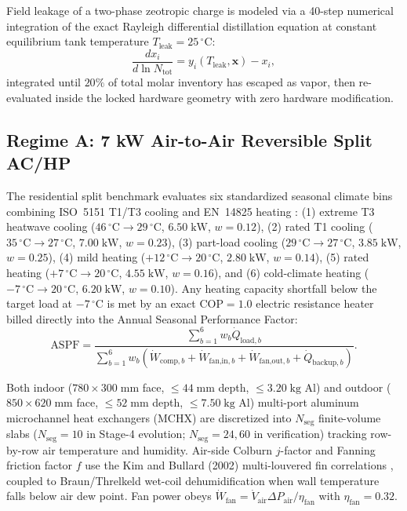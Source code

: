 \documentclass[twocolumn,10pt]{article}
\begin{document}
Field leakage of a two-phase zeotropic charge is modeled via a 40-step numerical integration of the exact Rayleigh differential distillation equation at constant equilibrium tank temperature $T_{\text{leak}}=25\,^\circ\text{C}$:
\begin{equation}
  \frac{dx_i}{d\ln N_{\text{tot}}} = y_i(T_{\text{leak}}, \mathbf{x}) - x_i,
  \label{eq:rayleigh}
\end{equation}
integrated until $20\%$ of total molar inventory has escaped as vapor, then re-evaluated inside the locked hardware geometry with zero hardware modification.

\subsection{Regime A: 7 kW Air-to-Air Reversible Split AC/HP}
The residential split benchmark evaluates six standardized seasonal climate bins combining ISO~5151 T1/T3 cooling and EN~14825 heating \citep{en14825}:
(1) extreme T3 heatwave cooling ($46\,^\circ\text{C}\to 29\,^\circ\text{C}$, $6.50\;\text{kW}$, $w=0.12$),
(2) rated T1 cooling ($35\,^\circ\text{C}\to 27\,^\circ\text{C}$, $7.00\;\text{kW}$, $w=0.23$),
(3) part-load cooling ($29\,^\circ\text{C}\to 27\,^\circ\text{C}$, $3.85\;\text{kW}$, $w=0.25$),
(4) mild heating ($+12\,^\circ\text{C}\to 20\,^\circ\text{C}$, $2.80\;\text{kW}$, $w=0.14$),
(5) rated heating ($+7\,^\circ\text{C}\to 20\,^\circ\text{C}$, $4.55\;\text{kW}$, $w=0.16$), and
(6) cold-climate heating ($-7\,^\circ\text{C}\to 20\,^\circ\text{C}$, $6.20\;\text{kW}$, $w=0.10$).
Any heating capacity shortfall below the target load at $-7\,^\circ\text{C}$ is met by an exact $\text{COP}=1.0$ electric resistance heater billed directly into the Annual Seasonal Performance Factor:
\begin{equation}
  \text{ASPF} = \frac{\sum_{b=1}^{6} w_b \dot{Q}_{\text{load},b}}{\sum_{b=1}^{6} w_b \left(\dot{W}_{\text{comp},b} + \dot{W}_{\text{fan,in},b} + \dot{W}_{\text{fan,out},b} + \dot{Q}_{\text{backup},b}\right)}.
  \label{eq:aspf}
\end{equation}

Both indoor ($780\times 300\;\text{mm}$ face, $\le 44\;\text{mm}$ depth, $\le 3.20\;\text{kg}$ Al) and outdoor ($850\times 620\;\text{mm}$ face, $\le 52\;\text{mm}$ depth, $\le 7.50\;\text{kg}$ Al) multi-port aluminum microchannel heat exchangers (MCHX) are discretized into $N_{\text{seg}}$ finite-volume slabs ($N_{\text{seg}}=10$ in Stage-4 evolution; $N_{\text{seg}}=24, 60$ in verification) tracking row-by-row air temperature and humidity. Air-side Colburn $j$-factor and Fanning friction factor $f$ use the Kim and Bullard (2002) multi-louvered fin correlations \citep{kim2002bullard}, coupled to Braun/Threlkeld wet-coil dehumidification when wall temperature falls below air dew point. Fan power obeys $\dot{W}_{\text{fan}} = \dot{V}_{\text{air}}\Delta P_{\text{air}}/\eta_{\text{fan}}$ with $\eta_{\text{fan}}=0.32$.
\end{document}
